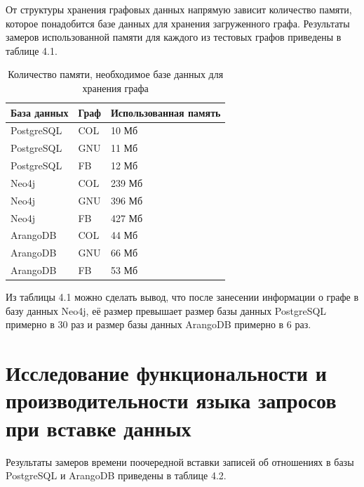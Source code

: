 От структуры хранения графовых данных напрямую зависит количество памяти, которое понадобится базе данных для хранения загруженного графа. Результаты замеров использованной памяти для каждого из тестовых графов приведены в таблице 4.1.

\begin{table} [htbp]
    \centering\small
    \caption{Количество памяти, необходимое базе данных для хранения графа}
    \begin{tabular}{|l|l|p{3cm}|}
        \hline
        База данных & Граф & Использованная память \\ \hline
        PostgreSQL  & COL  & 10 Мб                 \\ \hline
        PostgreSQL  & GNU  & 11 Мб                 \\ \hline
        PostgreSQL  & FB   & 12 Мб                 \\ \hline
        Neo4j       & COL  & 239 Мб                \\ \hline
        Neo4j       & GNU  & 396 Мб                \\ \hline
        Neo4j       & FB   & 427 Мб                \\ \hline
        ArangoDB    & COL  & 44 Мб                 \\ \hline
        ArangoDB    & GNU  & 66 Мб                 \\ \hline
        ArangoDB    & FB   & 53 Мб                 \\ \hline
    \end{tabular}
    \normalsize
\end{table}

Из таблицы 4.1 можно сделать вывод, что после занесении информации о графе в базу данных Neo4j, её размер превышает размер базы данных PostgreSQL примерно в 30 раз и размер базы данных ArangoDB примерно в 6 раз.


\section{Исследование функциональности и производительности языка запросов при вставке данных}

Результаты замеров времени поочередной вставки записей об отношениях в базы PostgreSQL и ArangoDB приведены в таблице 4.2.


